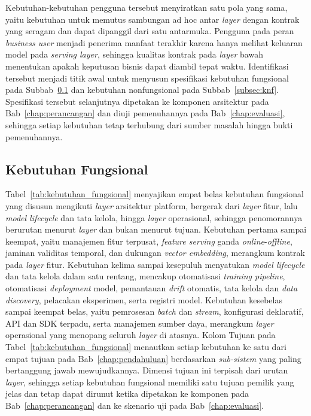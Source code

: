 Kebutuhan-kebutuhan pengguna tersebut menyiratkan satu pola yang sama, yaitu kebutuhan untuk memutus sambungan ad hoc antar \textit{layer} dengan kontrak yang seragam dan dapat dipanggil dari satu antarmuka. Pengguna pada peran \textit{business user} menjadi penerima manfaat terakhir karena hanya melihat keluaran model pada \textit{serving layer}, sehingga kualitas kontrak pada \textit{layer} bawah menentukan apakah keputusan bisnis dapat diambil tepat waktu. Identifikasi tersebut menjadi titik awal untuk menyusun spesifikasi kebutuhan fungsional pada Subbab~\ref{subsec:kf} dan kebutuhan nonfungsional pada Subbab~\ref{subsec:knf}. Spesifikasi tersebut selanjutnya dipetakan ke komponen arsitektur pada Bab~\ref{chap:perancangan} dan diuji pemenuhannya pada Bab~\ref{chap:evaluasi}, sehingga setiap kebutuhan tetap terhubung dari sumber masalah hingga bukti pemenuhannya.

\subsection{Kebutuhan Fungsional}
\label{subsec:kf}

Tabel~\ref{tab:kebutuhan_fungsional} menyajikan empat belas kebutuhan fungsional yang disusun mengikuti \textit{layer} arsitektur platform, bergerak dari \textit{layer} fitur, lalu \textit{model lifecycle} dan tata kelola, hingga \textit{layer} operasional, sehingga penomorannya berurutan menurut \textit{layer} dan bukan menurut tujuan. Kebutuhan pertama sampai keempat, yaitu manajemen fitur terpusat, \textit{feature serving} ganda \textit{online}-\textit{offline}, jaminan validitas temporal, dan dukungan \textit{vector embedding}, merangkum kontrak pada \textit{layer} fitur. Kebutuhan kelima sampai kesepuluh menyatukan \textit{model lifecycle} dan tata kelola dalam satu rentang, mencakup otomatisasi \textit{training pipeline}, otomatisasi \textit{deployment} model, pemantauan \textit{drift} otomatis, tata kelola dan \textit{data discovery}, pelacakan eksperimen, serta registri model. Kebutuhan kesebelas sampai keempat belas, yaitu pemrosesan \textit{batch} dan \textit{stream}, konfigurasi deklaratif, API dan SDK terpadu, serta manajemen sumber daya, merangkum \textit{layer} operasional yang menopang seluruh \textit{layer} di atasnya. Kolom Tujuan pada Tabel~\ref{tab:kebutuhan_fungsional} menautkan setiap kebutuhan ke satu dari empat tujuan pada Bab~\ref{chap:pendahuluan} berdasarkan \textit{sub-sistem} yang paling bertanggung jawab mewujudkannya. Dimensi tujuan ini terpisah dari urutan \textit{layer}, sehingga setiap kebutuhan fungsional memiliki satu tujuan pemilik yang jelas dan tetap dapat dirunut ketika dipetakan ke komponen pada Bab~\ref{chap:perancangan} dan ke skenario uji pada Bab~\ref{chap:evaluasi}.

